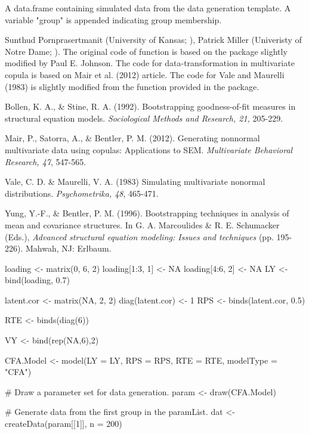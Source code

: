 \documentclass[a4paper]{book}
\begin{document}
%
\begin{Value}
A data.frame containing simulated data from the data generation template. A variable "group" is appended indicating group membership.
\end{Value}
%
\begin{Author}\relax
	
Sunthud Pornprasertmanit (University of Kansas; ), Patrick Miller (Univeristy of Notre Dame; ). The original code of  function is based on the  package slightly modified by Paul E. Johnson. The code for data-transformation in multivariate copula is based on Mair et al. (2012) article. The code for Vale and Maurelli (1983) is slightly modified from the function provided in the  package.
\end{Author}
%
\begin{References}\relax
Bollen, K. A., \& Stine, R. A. (1992). Bootstrapping goodness-of-fit measures in structural equation models. \emph{Sociological Methods and Research, 21,} 205-229.

Mair, P., Satorra, A., \& Bentler, P. M. (2012). Generating nonnormal multivariate data using copulas: Applications to SEM. \emph{Multivariate Behavioral Research, 47}, 547-565.

Vale, C. D. \& Maurelli, V. A. (1983) Simulating multivariate nonormal distributions. \emph{Psychometrika, 48}, 465-471.

Yung, Y.-F., \& Bentler, P. M. (1996). Bootstrapping techniques in analysis of mean and covariance structures. In G. A. Marcoulides \& R. E. Schumacker (Eds.), \emph{Advanced structural equation modeling: Issues and techniques} (pp. 195-226). Mahwah, NJ: Erlbaum.
\end{References}
%
\begin{Examples}
\begin{ExampleCode}
loading <- matrix(0, 6, 2)
loading[1:3, 1] <- NA
loading[4:6, 2] <- NA
LY <- bind(loading, 0.7)

latent.cor <- matrix(NA, 2, 2)
diag(latent.cor) <- 1
RPS <- binds(latent.cor, 0.5)

RTE <- binds(diag(6))

VY <- bind(rep(NA,6),2)

CFA.Model <- model(LY = LY, RPS = RPS, RTE = RTE, modelType = "CFA")

# Draw a parameter set for data generation.
param <- draw(CFA.Model)

# Generate data from the first group in the paramList.
dat <- createData(param[[1]], n = 200) 
\end{ExampleCode}
\end{Examples}
\end{document}
